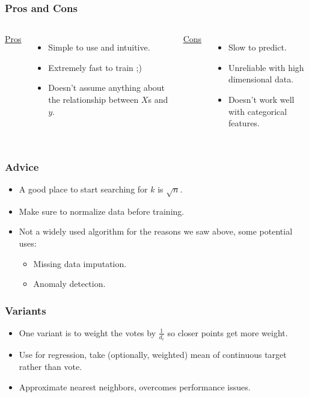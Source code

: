 \documentclass{beamer}
\begin{document}
\begin{frame}
  \frametitle{Pros and Cons}
  \begin{columns}
    \qquad \underline{\LARGE Pros} \vspace{3mm}
    \begin{itemize}
      \item Simple to use and intuitive.
      \item Extremely fast to train ;)
      \item Doesn't assume anything about the relationship between $X$s and $y$.
    \end{itemize} \pause

    \qquad \underline{\LARGE Cons} \vspace{3mm}
    \begin{itemize}
      \item Slow to predict.
      \item Unreliable with high dimensional data.
      \item Doesn't work well with categorical features.
    \end{itemize}
  \end{columns}
\end{frame}

\begin{frame}
  \frametitle{Advice}
  \begin{itemize}
    \item A good place to start searching for $k$ is $\sqrt{n}$. \vspace{2mm}
    \item Make sure to normalize data before training. \vspace{2mm}
    \item Not a widely used algorithm for the reasons we saw above, some potential uses: \vspace{2mm}
      \begin{itemize}
        \item Missing data imputation. \vspace{1mm}
        \item Anomaly detection. \vspace{1mm}
      \end{itemize}
  \end{itemize}
\end{frame}

\begin{frame}
  \frametitle{Variants}
  \begin{itemize}
    \item One variant is to weight the votes by $\frac{1}{d_i}$ so closer points get more weight. \vspace{2mm}
    \item Use for regression, take (optionally, weighted) mean of continuous target rather than vote. \vspace{2mm}
    \item Approximate nearest neighbors, overcomes performance issues.
  \end{itemize}
\end{frame}
\end{document}
